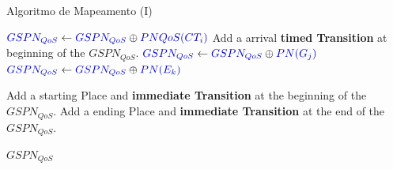 \documentclass[xcolor=svgnames]{beamer}
\begin{document}
\begin{frame}{Algoritmo de Mapeamento (I)}
\begin{algorithm}[H]
\begin{algorithmic}
{{			    %

			      \STATE $\textcolor{componentColor}{ GSPN_{QoS} } \leftarrow \textcolor{componentColor}{ GSPN_{QoS} } \oplus \textcolor{componentColor}{ PNQoS(CT_i) } $  		
			      \STATE Add a arrival \textbf{timed Transition} at beginning of the \textcolor{componentColor}{$GSPN_{QoS}$}.
			  \ENDFOR
			      \STATE $\textcolor{componentColor}{ GSPN_{QoS} } \leftarrow \textcolor{componentColor}{GSPN_{QoS}} \oplus \textcolor{componentColor}{ PN(G_j) }$	
			  \ENDFOR	
			      \STATE $\textcolor{componentColor}{ GSPN_{QoS} } \leftarrow \textcolor{componentColor}{ GSPN_{QoS} } \oplus \textcolor{componentColor}{ PN(E_k) }$  	
			  \ENDFOR

			  \STATE Add a starting Place and \textbf{immediate Transition} at the beginning of the \textcolor{componentColor}{ $GSPN_{QoS}$}.	
			  \STATE Add a ending Place and \textbf{immediate Transition} at the end of the \textcolor{componentColor}{$GSPN_{QoS}$}.	

			  \RETURN \textcolor{componentColor}{$GSPN_{QoS}$}
		}
	      }	
	
	\end{algorithmic}

      \end{algorithm}
  \end{frame}
\end{document}
